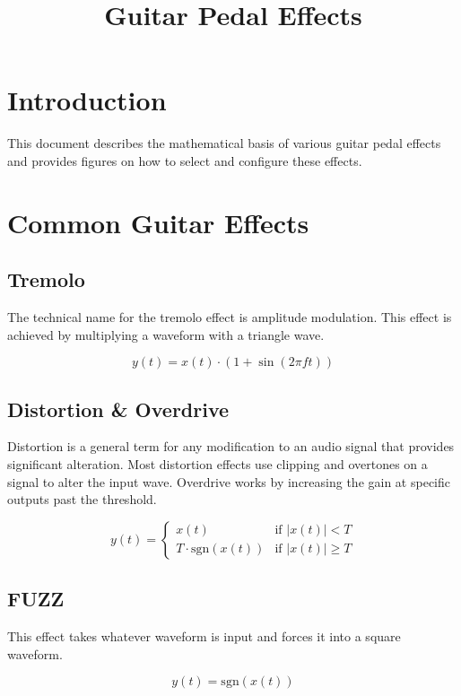 \documentclass{article}
\title{Guitar Pedal Effects}
\author{}
\date{}
\begin{document}
\maketitle

\section{Introduction}
This document describes the mathematical basis of various guitar pedal effects and provides figures on how to select and configure these effects.

\section{Common Guitar Effects}
\subsection{Tremolo}
The technical name for the tremolo effect is amplitude modulation. This effect is achieved by multiplying a waveform with a triangle wave.

\begin{equation}
y(t) = x(t) \cdot (1 + \sin(2 \pi f t))
\end{equation}

\subsection{Distortion \& Overdrive}
Distortion is a general term for any modification to an audio signal that provides significant alteration. Most distortion effects use clipping and overtones on a signal to alter the input wave. Overdrive works by increasing the gain at specific outputs past the threshold.

\begin{equation}
y(t) = \begin{cases} 
      x(t) & \text{if } |x(t)| < T \\
      T \cdot \text{sgn}(x(t)) & \text{if } |x(t)| \geq T 
   \end{cases}
\end{equation}

\subsection{FUZZ}
This effect takes whatever waveform is input and forces it into a square waveform.

\begin{equation}
y(t) = \text{sgn}(x(t))
\end{equation}
\end{document}
